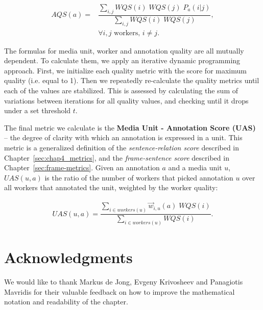 \begin{align}
AQS(a) = & \dfrac{ \sum\limits_{i,j} WQS(i) \; WQS(j) \; P_a(i | j) }{ \sum\limits_{i,j} WQS(i) \; WQS(j) }, \\
& \forall i, j \text{ workers, }  i \neq j . \nonumber
\end{align}

The formulas for media unit, worker and annotation quality are all mutually dependent. To calculate them, we apply an iterative dynamic programming approach. First, we initialize each quality metric with the score for maximum quality (i.e. equal to 1). Then we repeatedly re-calculate the quality metrics until each of the values are stabilized. This is assessed by calculating the sum of variations between iterations for all quality values, and checking until it drops under a set threshold $t$.

The final metric we calculate is the \textbf{Media Unit - Annotation Score (UAS)} -- the degree of clarity with which an annotation is expressed in a unit. This metric is a generalized definition of the \textit{sentence-relation score} described in Chapter~\ref{sec:chap4_metrics}, and the \textit{frame-sentence score} described in Chapter~\ref{sec:frame-metrics}. Given an annotation $a$ and a media unit $u$, $UAS(u, a)$ is the ratio of the number of workers that picked annotation $u$ over all workers that annotated the unit, weighted by the worker quality:

\begin{align}
UAS(u, a) = \dfrac{ \sum\limits_{i \in workers(u)} \vec{w}_{i,u}(a) \; WQS(i) }{ \sum\limits_{i \in workers(u)} WQS(i) }.
\end{align}


\section*{Acknowledgments}

We would like to thank Markus de Jong, Evgeny Krivosheev and Panagiotis Mavridis for their valuable feedback on how to improve the mathematical notation and readability of the chapter. 